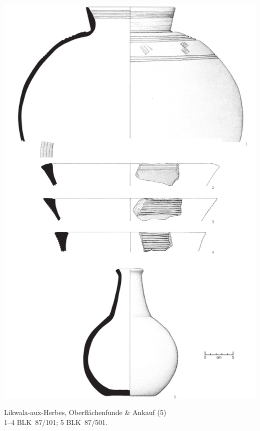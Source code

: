 \begin{pl}[H]
	\includegraphics{plt/Taf70.pdf}
	\vspace{.75em}\caption{Likwala-aux-Herbes, Oberflächenfunde \& Ankauf (5) \\ 1--4 BLK~87/101; 5 BLK~87/501.}
	\label{pl:70}
\end{pl}

